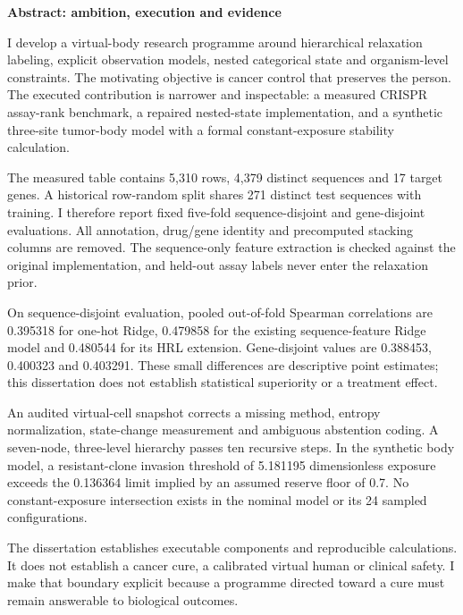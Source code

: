 \documentclass[10pt]{article}
\begin{document}
{\LARGE\bfseries\color{ink}Abstract: ambition, execution and evidence}\par\vspace{5pt}
I develop a virtual-body research programme around hierarchical relaxation labeling, explicit observation models, nested categorical state and organism-level constraints. The motivating objective is cancer control that preserves the person. The executed contribution is narrower and inspectable: a measured CRISPR assay-rank benchmark, a repaired nested-state implementation, and a synthetic three-site tumor-body model with a formal constant-exposure stability calculation.\par
The measured table contains 5,310 rows, 4,379 distinct sequences and 17 target genes. A historical row-random split shares 271 distinct test sequences with training. I therefore report fixed five-fold sequence-disjoint and gene-disjoint evaluations. All annotation, drug/gene identity and precomputed stacking columns are removed. The sequence-only feature extraction is checked against the original implementation, and held-out assay labels never enter the relaxation prior.\par
On sequence-disjoint evaluation, pooled out-of-fold Spearman correlations are 0.395318 for one-hot Ridge, 0.479858 for the existing sequence-feature Ridge model and 0.480544 for its HRL extension. Gene-disjoint values are 0.388453, 0.400323 and 0.403291. These small differences are descriptive point estimates; this dissertation does not establish statistical superiority or a treatment effect.\par
An audited virtual-cell snapshot corrects a missing method, entropy normalization, state-change measurement and ambiguous abstention coding. A seven-node, three-level hierarchy passes ten recursive steps. In the synthetic body model, a resistant-clone invasion threshold of 5.181195 dimensionless exposure exceeds the 0.136364 limit implied by an assumed reserve floor of 0.7. No constant-exposure intersection exists in the nominal model or its 24 sampled configurations.\par
The dissertation establishes executable components and reproducible calculations. It does not establish a cancer cure, a calibrated virtual human or clinical safety. I make that boundary explicit because a programme directed toward a cure must remain answerable to biological outcomes.\par
{}\par
\end{document}
